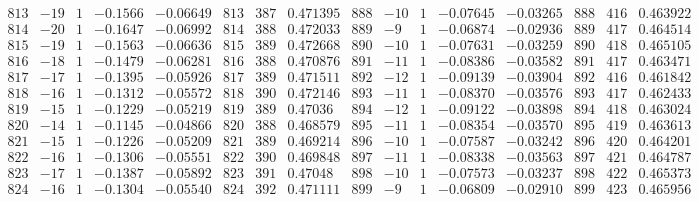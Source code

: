 \documentclass[11pt,reqno,a4letter]{article}
\numberwithin{figure}{section}
\numberwithin{table}{section}
\theoremstyle{plain}
\numberwithin{theorem}{section}
\theoremstyle{definition}
\begin{document}
\begin{table}[ht]
\begin{equation*}
{\begin{array}{ccccc|ccc|ccccc|ccc}
 813 & -19 & 1 & -0.1566 & -0.06649 & 813 & 387 & 0.471395 & 888 & -10 & 1 & -0.07645 & -0.03265 & 888 & 416 & 0.463922 \\
 814 & -20 & 1 & -0.1647 & -0.06992 & 814 & 388 & 0.472033 & 889 & -9 & 1 & -0.06874 & -0.02936 & 889 & 417 & 0.464514 \\
 815 & -19 & 1 & -0.1563 & -0.06636 & 815 & 389 & 0.472668 & 890 & -10 & 1 & -0.07631 & -0.03259 & 890 & 418 & 0.465105 \\
 816 & -18 & 1 & -0.1479 & -0.06281 & 816 & 388 & 0.470876 & 891 & -11 & 1 & -0.08386 & -0.03582 & 891 & 417 & 0.463471 \\
 817 & -17 & 1 & -0.1395 & -0.05926 & 817 & 389 & 0.471511 & 892 & -12 & 1 & -0.09139 & -0.03904 & 892 & 416 & 0.461842 \\
 818 & -16 & 1 & -0.1312 & -0.05572 & 818 & 390 & 0.472146 & 893 & -11 & 1 & -0.08370 & -0.03576 & 893 & 417 & 0.462433 \\
 819 & -15 & 1 & -0.1229 & -0.05219 & 819 & 389 & 0.47036 & 894 & -12 & 1 & -0.09122 & -0.03898 & 894 & 418 & 0.463024 \\
 820 & -14 & 1 & -0.1145 & -0.04866 & 820 & 388 & 0.468579 & 895 & -11 & 1 & -0.08354 & -0.03570 & 895 & 419 & 0.463613 \\
 821 & -15 & 1 & -0.1226 & -0.05209 & 821 & 389 & 0.469214 & 896 & -10 & 1 & -0.07587 & -0.03242 & 896 & 420 & 0.464201 \\
 822 & -16 & 1 & -0.1306 & -0.05551 & 822 & 390 & 0.469848 & 897 & -11 & 1 & -0.08338 & -0.03563 & 897 & 421 & 0.464787 \\
 823 & -17 & 1 & -0.1387 & -0.05892 & 823 & 391 & 0.47048 & 898 & -10 & 1 & -0.07573 & -0.03237 & 898 & 422 & 0.465373 \\
 824 & -16 & 1 & -0.1304 & -0.05540 & 824 & 392 & 0.471111 & 899 & -9 & 1 & -0.06809 & -0.02910 & 899 & 423 & 0.465956 \\
\end{array} 
}
\end{equation*} 
\clearpage 

\end{table} 

\clearpage 
\end{document}
